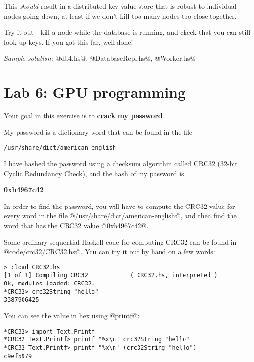\documentclass[11pt,a4paper]{article}
\newcommand{\Section}[2]{\section{#2}\label{sec:#1}}
\begin{document}
This \emph{should} result in a distributed key-value store that is
robust to individual nodes going down, at least if we don't kill too
many nodes too close together.

Try it out - kill a node while the database is running, and check that
you can still look up keys.  If you got this far, well done!

\emph{Sample solution:} @db4.hs@, @DatabaseRepl.hs@, @Worker.hs@

\newpage\Section{gpu}{Lab 6: GPU programming}


Your goal in this exercise is to \textbf{crack my password}.

My password is a dictionary word that can be found in the file

{\small \begin{verbatim}
/usr/share/dict/american-english
\end{verbatim}}

I have hashed the password using a checksum algorithm called CRC32
(32-bit Cyclic Redundancy Check), and the hash of my password is

\begin{center}
\textbf{\large 0xb4967c42}
\end{center}

In order to find the password, you will have to compute the CRC32
value for every word in the file @/usr/share/dict/american-english@, and then
find the word that has the CRC32 value @0xb4967c42@.

Some ordinary sequential Haskell code for computing CRC32 can be found
in @code/crc32/CRC32.hs@.  You can try it out by hand on a few words:

{\small \begin{verbatim}
> :load CRC32.hs
[1 of 1] Compiling CRC32            ( CRC32.hs, interpreted )
Ok, modules loaded: CRC32.
*CRC32> crc32String "hello"
3387906425
\end{verbatim}}

You can see the value in hex using @printf@:

{\small \begin{verbatim}
*CRC32> import Text.Printf
*CRC32 Text.Printf> printf "%x\n" crc32String "hello"
*CRC32 Text.Printf> printf "%x\n" (crc32String "hello")
c9ef5979
\end{verbatim}}
\end{document}
